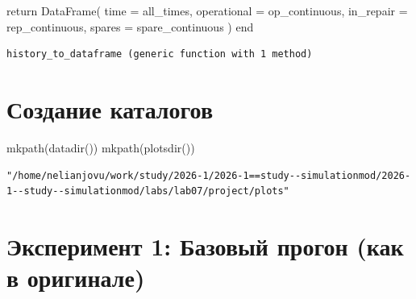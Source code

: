 \documentclass[
  12pt,
  a4paper,
  DIV=11,
  numbers=noendperiod]{scrreprt}
\newenvironment{Shaded}{\begin{snugshade}}{\end{snugshade}}
\newcommand{\ControlFlowTok}[1]{\textcolor[rgb]{0.00,0.23,0.31}{#1}}
\newcommand{\DataTypeTok}[1]{\textcolor[rgb]{0.68,0.00,0.00}{#1}}
\newcommand{\FloatTok}[1]{\textcolor[rgb]{0.68,0.00,0.00}{#1}}
\newcommand{\FunctionTok}[1]{\textcolor[rgb]{0.28,0.35,0.67}{#1}}
\newcommand{\KeywordTok}[1]{\textcolor[rgb]{0.00,0.23,0.31}{#1}}
\newcommand{\NormalTok}[1]{\textcolor[rgb]{0.00,0.23,0.31}{#1}}
\newcommand{\OperatorTok}[1]{\textcolor[rgb]{0.37,0.37,0.37}{#1}}
\newcommand{\SpecialCharTok}[1]{\textcolor[rgb]{0.37,0.37,0.37}{#1}}
\newcommand{\StringTok}[1]{\textcolor[rgb]{0.13,0.47,0.30}{#1}}
\begin{document}
\begin{Shaded}
\begin{Highlighting}[]
    \ControlFlowTok{return} \FunctionTok{DataFrame}\NormalTok{(}
\NormalTok{        time }\OperatorTok{=}\NormalTok{ all\_times,}
\NormalTok{        operational }\OperatorTok{=}\NormalTok{ op\_continuous,}
\NormalTok{        in\_repair }\OperatorTok{=}\NormalTok{ rep\_continuous,}
\NormalTok{        spares }\OperatorTok{=}\NormalTok{ spare\_continuous}
\NormalTok{    )}
\KeywordTok{end}
\end{Highlighting}
\end{Shaded}

\begin{verbatim}
history_to_dataframe (generic function with 1 method)
\end{verbatim}

\section{Создание
каталогов}\label{ux441ux43eux437ux434ux430ux43dux438ux435-ux43aux430ux442ux430ux43bux43eux433ux43eux432}

\begin{Shaded}
\begin{Highlighting}[]
\FunctionTok{mkpath}\NormalTok{(}\FunctionTok{datadir}\NormalTok{())}
\FunctionTok{mkpath}\NormalTok{(}\FunctionTok{plotsdir}\NormalTok{())}
\end{Highlighting}
\end{Shaded}

\begin{verbatim}
"/home/nelianjovu/work/study/2026-1/2026-1==study--simulationmod/2026-1--study--simulationmod/labs/lab07/project/plots"
\end{verbatim}

\section{Эксперимент 1: Базовый прогон (как в
оригинале)}\label{ux44dux43aux441ux43fux435ux440ux438ux43cux435ux43dux442-1-ux431ux430ux437ux43eux432ux44bux439-ux43fux440ux43eux433ux43eux43d-ux43aux430ux43a-ux432-ux43eux440ux438ux433ux438ux43dux430ux43bux435}

\begin{Shaded}
\end{Shaded}
\end{document}
